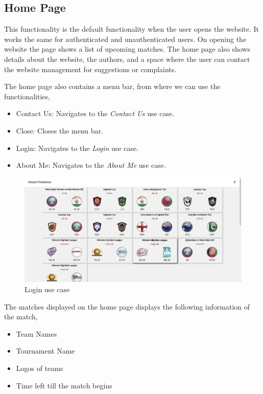 \documentclass[12pt]{article}
\begin{document}
\subsection{Home Page}
This functionality is the default functionality when the user opens the website. It works the same for authenticated and unauthenticated users. On opening the website the page shows a list of upcoming matches. The home page also shows details about the website, the authors, and a space where the user can contact the website management for suggestions or complaints.\par
The home page also contains a menu bar, from where we can use the functionalities,
\begin{itemize}
    \item Contact Us: Navigates to the \textit{Contact Us} use case.
    \item Close: Closes the menu bar.
    \item Login: Navigates to the \textit{Login} use case.
    \item About Me: Navigates to the \textit{About Me} use case.
\end{itemize}
\begin{figure}[!h]
    \includegraphics[scale=0.2]{homepage.png}
    \caption{Login use case}
\end{figure}
\par The matches displayed on the home page displays the following information of the match,
\begin{itemize}
    \item Team Names
    \item Tournament Name
    \item Logos of teams
    \item Time left till the match begins
\end{itemize}
\end{document}
